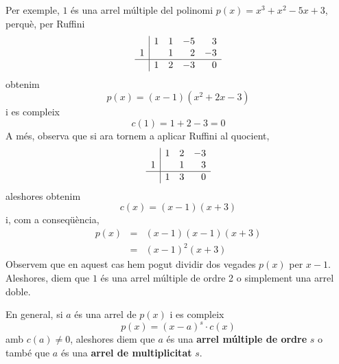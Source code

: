 Per exemple, $1$ és una arrel múltiple del polinomi $p(x)=x^{3}+x^{2}-5x+3$, perquè, per Ruffini\begin{equation*}
\begin{array}{r|rrrr}
& 1 & 1 & -5 & 3 \\
1 & & 1 & 2 & -3 \\ \hline
& 1 & 2 & -3 & 0\end{array}\end{equation*}obtenim\begin{equation*}
p(x)=(x-1)(x^{2}+2x-3)
\end{equation*}i es compleix\begin{equation*}
c(1)=1+2-3=0
\end{equation*}A més, observa que si ara tornem a aplicar Ruffini al quocient,\begin{equation*}
\begin{array}{r|rrr}
& 1 & 2 & -3 \\
1 & & 1 & 3 \\ \hline
& 1 & 3 & 0\end{array}\end{equation*}aleshores obtenim\begin{equation*}
c(x)=(x-1)(x+3)
\end{equation*}i, com a conseqüència,\begin{eqnarray*}
p(x) &=&(x-1)(x-1)(x+3) \\
&=&(x-1)^{2}(x+3)
\end{eqnarray*}Observem que en aquest cas hem pogut dividir dos vegades $p(x)$ per $x-1$. Aleshores, diem que $1$ és una arrel múltiple de ordre 2 o
simplement una arrel doble.

En general, si $a$ és una arrel de $p(x)$ i es compleix\begin{equation*}
p(x)=(x-a)^{s}\cdot c(x)
\end{equation*}amb $c(a)\neq 0$, aleshores diem que $a$ és una \textbf{arrel múltiple de ordre} $s$ o també que $a$ és una \textbf{arrel de
multiplicitat} $s$.

